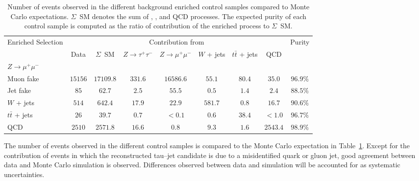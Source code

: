 \begin{table}
\begin{center}
\tablesize
\begin{tabular}{|l|c|c|c|c|c|c|c|c|}
\hline
\multirow{2}{17mm}{Enriched Selection} & \multicolumn{7}{c|}{Contribution from} & \multirow{2}{12mm}{Purity} \\
 & Data & $\Sigma$~SM & $Z \to \tau^{+} \tau^{-}$ & $Z \to \mu^{+} \mu^{-}$ & $W$ + jets & $t\bar{t}$ + jets & QCD & \\
\hline
\hline
$Z \to \mu^{+} \mu^{-}$ & & & & & & & & \\
\hspace{2mm} Muon fake & $15156$ & $17109.8$ & $331.6$ & $16586.6$ & $55.1$ & $80.4$ & $35.0$ & $96.9\%$ \\
\hspace{2mm} Jet fake & $85$ & $62.7$ & $2.5$ & $55.5$ & $0.5$ & $1.4$ & $2.4$ & $88.5\%$ \\
$W$ + jets & $514$ & $642.4$ & $17.9$ & $22.9$ & $581.7$ & $0.8$ & $16.7$ & $90.6\%$ \\  
$t\bar{t}$ + jets & $26$ & $39.7$ & $0.7$ & $< 0.1$ & $0.6$ & $38.4$ & $< 1.0$ & $96.7\%$ \\
QCD & $2510$ & $2571.8$ & $16.6$ & $0.8$ & $9.3$ & $1.6$ & $2543.4$ & $98.9\%$ \\
\hline
\end{tabular}
\caption[Comparison of background control region yields in data and the
prediction from simulation]{\captiontext 
         Number of events observed in the different background enriched control
         samples compared to Monte Carlo expectations.  $\Sigma$~SM denotes the
         sum of \ZTT, \ZMM, \WpJets
         \ttbarpJets and QCD processes.  The expected purity of each
         control sample is computed as the ratio of contribution of the enriched
         process to $\Sigma$~SM.}
\label{tab:ResultsMuTauBgControlRegions}
\end{center}
\end{table}

The number of events observed in the different control samples is compared to
the Monte Carlo expectation in Table~\ref{tab:ResultsMuTauBgControlRegions}.
Except for the contribution of \ZMM events in which the
reconstructed tau--jet candidate is due to a misidentified quark or gluon jet,
good agreement between data and Monte Carlo simulation is observed.  Differences
observed between data and simulation will be accounted for as systematic
uncertainties.

